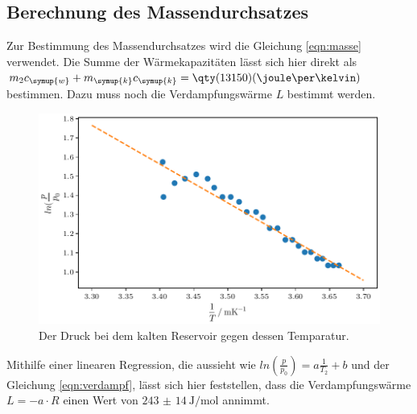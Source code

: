 \subsection{Berechnung des Massendurchsatzes}

Zur Bestimmung des Massendurchsatzes wird die Gleichung \ref{eqn:masse} verwendet. Die Summe der Wärmekapazitäten lässt sich hier 
direkt als $m_2c_{\symup{w}}+m_{\symup{k}}c_{\symup{k}}=\qty(13150)(\joule\per\kelvin)$ bestimmen. Dazu muss noch die Verdampfungswärme
$L$ bestimmt werden.

\begin{figure}
    \centering
    \includegraphics{verdampfplot.pdf}
    \caption{Der Druck bei dem kalten Reservoir gegen dessen Temparatur.}
    \label{fig:druckkalt}
\end{figure}

Mithilfe einer linearen Regression, die aussieht wie $ln(\frac{p}{p_0})=a\frac{1}{T_2}+b$ und der Gleichung \ref{eqn:verdampf},
lässt sich hier feststellen, dass die Verdampfungswärme $L=-a \cdot R$ einen Wert von $\qty{243(14)}{\joule\per\mole}$ annimmt.